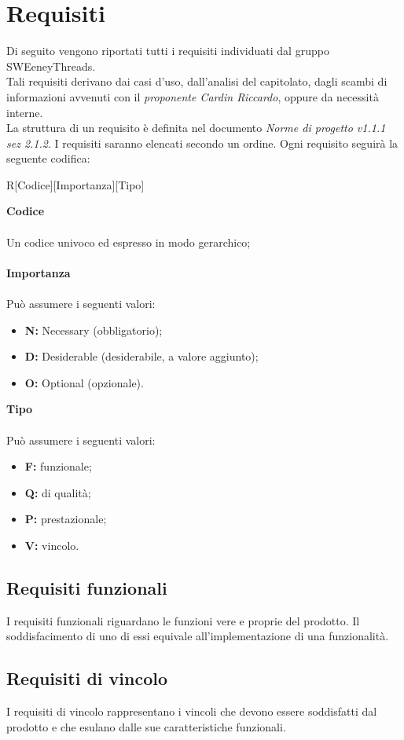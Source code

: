 \documentclass[a4paper]{report}
\newcommand{\mychapter}[2]{
	\setcounter{chapter}{#1}
	\setcounter{section}{0}
	\setcounter{subsection}{1}
	\chapter*{#2}
	\addcontentsline{toc}{chapter}{#2}
}
\begin{document}
	 
	\mychapter{4}{Requisiti}
		Di seguito vengono riportati tutti i requisiti individuati dal gruppo SWEeneyThreads. \\Tali requisiti
		derivano dai casi d’uso, dall'analisi del capitolato, dagli scambi di informazioni avvenuti con il
		\emph{proponente Cardin Riccardo}, oppure da necessità interne. \\
		La struttura di un requisito è definita nel documento \emph{Norme di progetto v1.1.1 sez 2.1.2}.
		I requisiti saranno elencati secondo un ordine. Ogni requisito seguirà la seguente codifica: \\
		\begin{center}
			R[Codice][Importanza][Tipo]
		\end{center}
		\textbf{Codice} \\ \\ Un codice univoco ed espresso in modo gerarchico;\\ \\
		\textbf{Importanza} \\ \\Può assumere i seguenti valori:
		\begin{itemize}
			\item \textbf{N:} Necessary (obbligatorio);
			\item \textbf{D:} Desiderable (desiderabile, a valore aggiunto);
			\item \textbf{O:} Optional (opzionale).
		\end{itemize}
		\textbf{Tipo} \\ \\Può assumere i seguenti valori:
		\begin{itemize}
			\item \textbf{F:} funzionale;
			\item \textbf{Q:} di qualità;
			\item \textbf{P:} prestazionale;
			\item \textbf{V:} vincolo.
		\end{itemize}
	
	\section{Requisiti funzionali}
	I requisiti funzionali riguardano le funzioni vere e proprie del prodotto. Il soddisfacimento di uno di essi
	equivale all'implementazione di una funzionalità.
	\section{Requisiti di vincolo}
	I requisiti di vincolo rappresentano i vincoli che devono essere soddisfatti dal prodotto e che esulano dalle
	sue caratteristiche funzionali.
\end{document}
